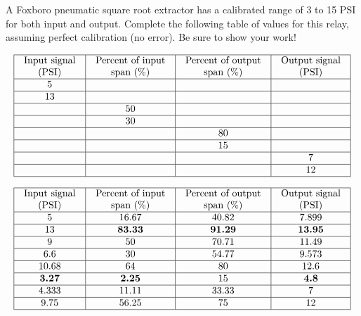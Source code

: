 

A Foxboro pneumatic square root extractor has a calibrated range of 3 to 15 PSI for both input and output.  Complete the following table of values for this relay, assuming perfect calibration (no error).  Be sure to show your work!


$$\vbox{\offinterlineskip
\halign{\strut
\vrule \quad\hfil # \ \hfil & 
\vrule \quad\hfil # \ \hfil & 
\vrule \quad\hfil # \ \hfil & 
\vrule \quad\hfil # \ \hfil \vrule \cr
\noalign{\hrule}
%
Input signal & Percent of input & Percent of output & Output signal \cr
%
(PSI) & span (\%) & span (\%) & (PSI) \cr
%
\noalign{\hrule}
%
5 &  &  &  \cr
%
\noalign{\hrule}
%
13 &  &  &  \cr
%
\noalign{\hrule}
%
 & 50 &  &  \cr
%
\noalign{\hrule}
%
 & 30 &  &  \cr
%
\noalign{\hrule}
%
 &  & 80 &  \cr
%
\noalign{\hrule}
%
 &  & 15 &  \cr
%
\noalign{\hrule}
%
 &  &  & 7 \cr
%
\noalign{\hrule}
%
 &  &  & 12 \cr
%
\noalign{\hrule}
} %
}$$ %

%







$$\vbox{\offinterlineskip
\halign{\strut
\vrule \quad\hfil # \ \hfil & 
\vrule \quad\hfil # \ \hfil & 
\vrule \quad\hfil # \ \hfil & 
\vrule \quad\hfil # \ \hfil \vrule \cr
\noalign{\hrule}
%
Input signal & Percent of input & Percent of output & Output signal \cr
%
(PSI) & span (\%) & span (\%) & (PSI) \cr
%
\noalign{\hrule}
%
5 & 16.67 & 40.82 & 7.899 \cr
%
\noalign{\hrule}
%
13 & {\bf 83.33} & {\bf 91.29} & {\bf 13.95} \cr
%
\noalign{\hrule}
%
9 & 50 & 70.71 & 11.49 \cr
%
\noalign{\hrule}
%
6.6 & 30 & 54.77 & 9.573 \cr
%
\noalign{\hrule}
%
10.68 & 64 & 80 & 12.6 \cr
%
\noalign{\hrule}
%
{\bf 3.27} & {\bf 2.25} & 15 & {\bf 4.8} \cr
%
\noalign{\hrule}
%
4.333 & 11.11 & 33.33 & 7 \cr
%
\noalign{\hrule}
%
9.75 & 56.25 & 75 & 12 \cr
%
\noalign{\hrule}
} %
}$$ %

